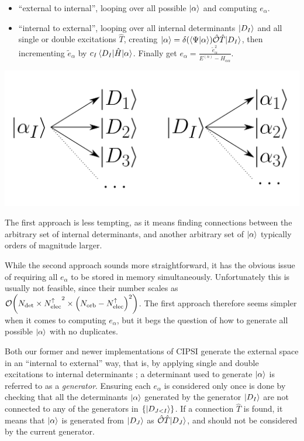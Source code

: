 \documentclass[./thesis.tex]{subfiles}
\begin{document}
\begin{itemize}
\item
``external to internal'', looping over all possible ${\ket{\alpha}}$ and computing $e_\alpha$.
\item
``internal to external'', looping over all internal determinants ${\ket{D_I}}$ and all single or double excitations $\hat T$, creating ${\ket{\alpha}} = \delta \qty(\braket{\Psi}{\alpha} ) {\hat{\mathcal{O}}} \hat T {\ket{D_I}}$, then incrementing $\tilde e_{\alpha}$ by $c_I\mel{D_I}{\hat{H}}{\alpha}$. Finally get $e_{\alpha} = \frac{\tilde e_\alpha^2}{E^{(n)} - H_{\alpha \alpha}}$.
\end{itemize}

	\begin{center}
		\includegraphics[width=0.45\columnwidth]{figures/matrix_dressing/interactions}
	\end{center}

The first approach is less tempting, as it means finding connections between the arbitrary set of internal determinants, and another arbitrary set of ${\ket{\alpha}}$ typically orders of magnitude larger.

While the second approach sounds more straightforward, it has the obvious issue of requiring all $e_\alpha$ to be stored in memory simultaneously. Unfortunately this is usually not feasible, since their number scales as $\order{\Ndet \times \Nalpha^2 \times \qty(\Norb - \Nalpha)^2}$.
The first approach therefore seems simpler when it comes to computing $e_\alpha$, but it begs the question of how to generate all possible ${\ket{\alpha}}$ with no duplicates. 

Both our former and newer implementations of CIPSI generate the external space in an ``internal to external'' way, that is, by applying single and double excitations to internal determinants ; a determinant used to generate ${\ket{\alpha}}$ is referred to as a \emph{generator}.
Ensuring each $e_\alpha$ is considered only once is done by checking that all the determinants ${\ket{\alpha}}$ generated by the generator ${\ket{D_I}}$ are not connected to any of the generators in $\{ \ket{D_{J<I}} \}$.
If a connection $\hat T$ is found, it means that ${\ket{\alpha}}$ is generated from ${\ket{D_J}}$ as ${\hat{\mathcal{O}}} \hat T {\ket{D_J}}$, and should not be considered by the current generator.
\end{document}

